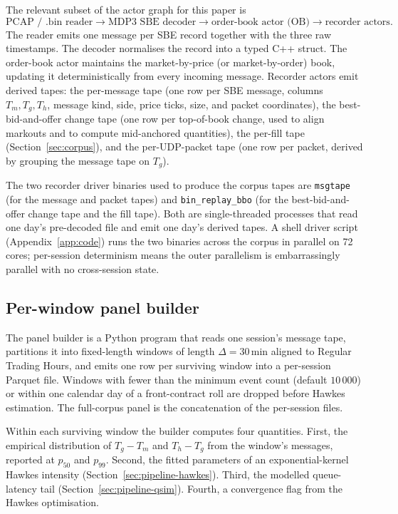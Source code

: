 \documentclass[11pt]{article}
\begin{document}
The relevant subset of the actor graph for this paper is
\[
\text{PCAP / .bin reader} \longrightarrow \text{MDP3 SBE decoder} \longrightarrow \text{order-book actor (OB)} \longrightarrow \text{recorder actors}.
\]
The reader emits one message per SBE record together with the three raw timestamps. The decoder normalises the record into a typed C++ struct. The order-book actor maintains the market-by-price (or market-by-order) book, updating it deterministically from every incoming message. Recorder actors emit derived tapes: the per-message tape (one row per SBE message, columns $T_m, T_g, T_h$, message kind, side, price ticks, size, and packet coordinates), the best-bid-and-offer change tape (one row per top-of-book change, used to align markouts and to compute mid-anchored quantities), the per-fill tape (Section~\ref{sec:corpus}), and the per-UDP-packet tape (one row per packet, derived by grouping the message tape on $T_g$).

The two recorder driver binaries used to produce the corpus tapes are \texttt{msgtape} (for the message and packet tapes) and \texttt{bin\_replay\_bbo} (for the best-bid-and-offer change tape and the fill tape). Both are single-threaded processes that read one day's pre-decoded file and emit one day's derived tapes. A shell driver script (Appendix~\ref{app:code}) runs the two binaries across the corpus in parallel on 72 cores; per-session determinism means the outer parallelism is embarrassingly parallel with no cross-session state.

\subsection{Per-window panel builder}
\label{sec:pipeline-panel}

The panel builder is a Python program that reads one session's message tape, partitions it into fixed-length windows of length $\Delta = 30\,\text{min}$ aligned to Regular Trading Hours, and emits one row per surviving window into a per-session Parquet file. Windows with fewer than the minimum event count (default $10\,000$) or within one calendar day of a front-contract roll are dropped before Hawkes estimation. The full-corpus panel is the concatenation of the per-session files.

Within each surviving window the builder computes four quantities. First, the empirical distribution of $T_g - T_m$ and $T_h - T_g$ from the window's messages, reported at $p_{50}$ and $p_{99}$. Second, the fitted parameters of an exponential-kernel Hawkes intensity (Section~\ref{sec:pipeline-hawkes}). Third, the modelled queue-latency tail (Section~\ref{sec:pipeline-qsim}). Fourth, a convergence flag from the Hawkes optimisation.
\end{document}
